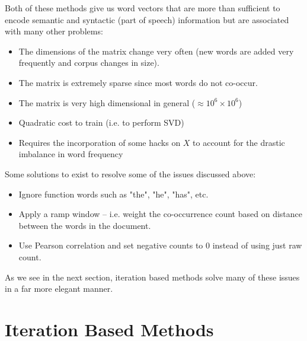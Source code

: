 \documentclass[nobib]{tufte-handout}
\begin{document}
Both of these methods give us word vectors that are more than sufficient to encode semantic and syntactic (part of speech) information but are associated with many other problems:

\begin{itemize}
\item The dimensions of the matrix change very often (new words are added very frequently and corpus changes in size).
\item The matrix is extremely sparse since most words do not co-occur.
\item The matrix is very high dimensional in general ($\approx 10^6 \times 10^6$)
\item Quadratic cost to train (i.e. to perform SVD)
\item Requires the incorporation of some hacks on $X$ to account for the drastic imbalance in word frequency
\end{itemize}
Some solutions to exist to resolve some of the issues discussed above:
\begin{itemize}
\item Ignore function words such as "the", "he", "has", etc.
\item Apply a ramp window -- i.e. weight the co-occurrence count based on distance between the words in the document. 
\item Use Pearson correlation and set negative counts to 0 instead of using just raw count.
\end{itemize}

As we see in the next section, iteration based methods solve many of these issues in a far more elegant manner.

\section{Iteration Based Methods}\label{sec:itermethods}

\end{document}
